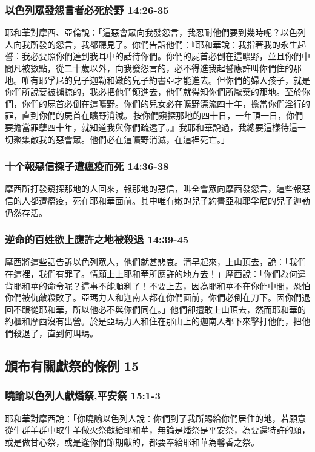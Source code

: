 \subsubsection{以色列眾發怨言者必死於野 14:26-35}
耶和華對摩西、亞倫說：「這惡會眾向我發怨言，我忍耐他們要到幾時呢？以色列人向我所發的怨言，我都聽見了。你們告訴他們：『耶和華說：我指著我的永生起誓：我必要照你們達到我耳中的話待你們。你們的屍首必倒在這曠野，並且你們中間凡被數點，從二十歲以外，向我發怨言的，必不得進我起誓應許叫你們住的那地。唯有耶孚尼的兒子迦勒和嫩的兒子約書亞才能進去。但你們的婦人孩子，就是你們所說要被擄掠的，我必把他們領進去，他們就得知你們所厭棄的那地。至於你們，你們的屍首必倒在這曠野。你們的兒女必在曠野漂流四十年，擔當你們淫行的罪，直到你們的屍首在曠野消滅。 按你們窺探那地的四十日，一年頂一日，你們要擔當罪孽四十年，就知道我與你們疏遠了。』我耶和華說過，我總要這樣待這一切聚集敵我的惡會眾。他們必在這曠野消滅，在這裡死亡。」

\subsubsection{十个報惡信探子遭瘟疫而死 14:36-38}
摩西所打發窺探那地的人回來，報那地的惡信，叫全會眾向摩西發怨言，這些報惡信的人都遭瘟疫，死在耶和華面前。其中唯有嫩的兒子約書亞和耶孚尼的兒子迦勒仍然存活。

\subsubsection{逆命的百姓欲上應許之地被殺退 14:39-45}
摩西將這些話告訴以色列眾人，他們就甚悲哀。清早起來，上山頂去，說：「我們在這裡，我們有罪了。情願上上耶和華所應許的地方去！」摩西說：「你們為何違背耶和華的命令呢？這事不能順利了！不要上去，因為耶和華不在你們中間，恐怕你們被仇敵殺敗了。亞瑪力人和迦南人都在你們面前，你們必倒在刀下。因你們退回不跟從耶和華，所以他必不與你們同在。」他們卻擅敢上山頂去，然而耶和華的約櫃和摩西沒有出營。於是亞瑪力人和住在那山上的迦南人都下來擊打他們，把他們殺退了，直到何珥瑪。

\subsection{頒布有關獻祭的條例 15}
\subsubsection{曉諭以色列人獻燔祭,平安祭 15:1-3}
耶和華對摩西說：「你曉諭以色列人說：你們到了我所賜給你們居住的地，若願意從牛群羊群中取牛羊做火祭獻給耶和華，無論是燔祭是平安祭，為要還特許的願，或是做甘心祭，或是逢你們節期獻的，都要奉給耶和華為馨香之祭。

